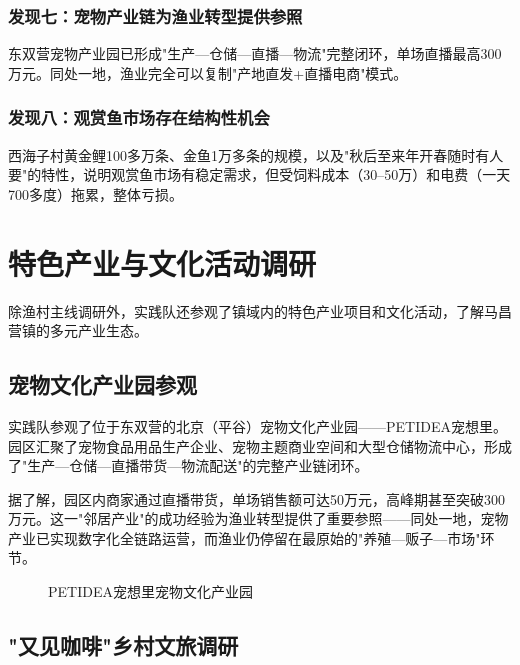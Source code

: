 \documentclass[12pt,a4paper]{article}
\begin{document}
\subsubsection{发现七：宠物产业链为渔业转型提供参照}

东双营宠物产业园已形成"生产---仓储---直播---物流"完整闭环，单场直播最高300万元。同处一地，渔业完全可以复制"产地直发+直播电商"模式。

\subsubsection{发现八：观赏鱼市场存在结构性机会}

西海子村黄金鲤100多万条、金鱼1万多条的规模，以及"秋后至来年开春随时有人要"的特性，说明观赏鱼市场有稳定需求，但受饲料成本（30--50万）和电费（一天700多度）拖累，整体亏损。

\section{特色产业与文化活动调研}

除渔村主线调研外，实践队还参观了镇域内的特色产业项目和文化活动，了解马昌营镇的多元产业生态。

\subsection{宠物文化产业园参观}

实践队参观了位于东双营的北京（平谷）宠物文化产业园——PETIDEA宠想里。园区汇聚了宠物食品用品生产企业、宠物主题商业空间和大型仓储物流中心，形成了"生产---仓储---直播带货---物流配送"的完整产业链闭环。

据了解，园区内商家通过直播带货，单场销售额可达50万元，高峰期甚至突破300万元。这一"邻居产业"的成功经验为渔业转型提供了重要参照——同处一地，宠物产业已实现数字化全链路运营，而渔业仍停留在最原始的"养殖---贩子---市场"环节。

\begin{figure}[H]
\centering
{}
\caption{PETIDEA宠想里宠物文化产业园}
\end{figure}

\subsection{"又见咖啡"乡村文旅调研}
\end{document}
